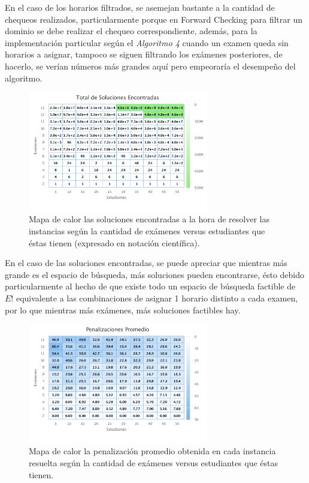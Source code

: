 \documentclass[letter, 10pt]{article}
\begin{document}
En el caso de los horarios filtrados, se asemejan bastante a la cantidad de chequeos realizados, particularmente porque en Forward Checking para filtrar un dominio se debe realizar el chequeo correspondiente, además, para la implementación particular según el \textit{Algoritmo 4} cuando un examen queda sin horarios a asignar, tampoco se siguen filtrando los exámenes posteriores, de hacerlo, se verían números más grandes aquí pero empeoraría el desempeño del algoritmo.

\begin{figure}[H]
\begin{center}
\includegraphics[width=0.7\textwidth]{img/g5.pdf}
\end{center}
\caption{Mapa de calor las soluciones encontradas a la hora de resolver las instancias según la cantidad de exámenes versus estudiantes que éstas tienen (expresado en notación científica).}
\label{fig:g5}
\end{figure}

En el caso de las soluciones encontradas, se puede apreciar que mientras más grande es el espacio de búsqueda, más soluciones pueden encontrarse, ésto debido particularmente al hecho de que existe todo un espacio de búsqueda factible de $E!$ equivalente a las combinaciones de asignar 1 horario distinto a cada examen, por lo que mientras más exámenes, más soluciones factibles hay.

\begin{figure}[H]
\begin{center}
\includegraphics[width=0.7\textwidth]{img/g6.pdf}
\end{center}
\caption{Mapa de calor la penalización promedio obtenida en cada instancia resuelta según la cantidad de exámenes versus estudiantes que éstas tienen.}
\label{fig:g6}
\end{figure}
\end{document}
